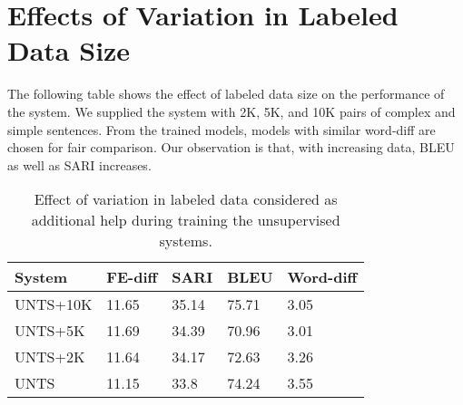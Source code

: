 \documentclass[11pt,a4paper]{article}
\begin{document}
\section{Effects of Variation in Labeled Data Size}
\label{appendix:datavar}
The following table shows the effect of labeled data size on the performance of the system. We supplied the system with 2K, 5K, and 10K pairs of complex and simple sentences. From the trained models, models with similar word-diff are chosen for fair comparison. Our observation is that, with increasing data, BLEU as well as SARI increases.
\begin{table}[H]
\centering
\scriptsize
\begin{tabular}{lllll}
\toprule
\textbf{System} & \textbf{FE-diff} & \textbf{SARI} & \textbf{BLEU} & \textbf{Word-diff} \\
\midrule
\textsc{UNTS}+10K & 11.65 & 35.14 & 75.71 & {3.05} \\ \textsc{UNTS}+5K & 11.69 & 34.39 & 70.96 & {3.01} \\ \textsc{UNTS}+2K & 11.64 & 34.17 & 72.63 & {3.26} \\
\textsc{UNTS} & 11.15 & 33.8 & 74.24 & {3.55}\\ \hline \end{tabular}
\caption{Effect of variation in labeled data considered as additional help during training the unsupervised systems.}
\label{tab:ablation-2} 
\end{table}





















%
  
\end{document}
